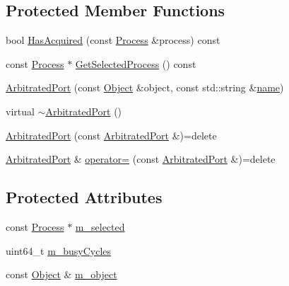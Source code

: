 \subsection*{Protected Member Functions}
\begin{DoxyCompactItemize}
\item 
bool \hyperlink{class_simulator_1_1_arbitrated_port_ad6c149235194bb222005db4ea0352993}{Has\+Acquired} (const \hyperlink{class_simulator_1_1_process}{Process} \&process) const 
\item 
const \hyperlink{class_simulator_1_1_process}{Process} $\ast$ \hyperlink{class_simulator_1_1_arbitrated_port_af666b307417955fb5ac4657986fea2ab}{Get\+Selected\+Process} () const 
\item 
\hyperlink{class_simulator_1_1_arbitrated_port_a1720c2c4547412047aca58dd3ec64d96}{Arbitrated\+Port} (const \hyperlink{class_simulator_1_1_object}{Object} \&object, const std\+::string \&\hyperlink{mtconf_8c_a8f8f80d37794cde9472343e4487ba3eb}{name})
\item 
virtual \hyperlink{class_simulator_1_1_arbitrated_port_a81321f2d8f5db456bb2f0e1710128ea1}{$\sim$\+Arbitrated\+Port} ()
\item 
\hyperlink{class_simulator_1_1_arbitrated_port_a717b1baf7f49444319d47556d26a8608}{Arbitrated\+Port} (const \hyperlink{class_simulator_1_1_arbitrated_port}{Arbitrated\+Port} \&)=delete
\item 
\hyperlink{class_simulator_1_1_arbitrated_port}{Arbitrated\+Port} \& \hyperlink{class_simulator_1_1_arbitrated_port_a5ec4bcf9c7f4dedcb220d56750219c7e}{operator=} (const \hyperlink{class_simulator_1_1_arbitrated_port}{Arbitrated\+Port} \&)=delete
\end{DoxyCompactItemize}
\subsection*{Protected Attributes}
\begin{DoxyCompactItemize}
\item 
const \hyperlink{class_simulator_1_1_process}{Process} $\ast$ \hyperlink{class_simulator_1_1_arbitrated_port_a4530ac48737b148a87a44a6641d2979b}{m\+\_\+selected}
\item 
uint64\+\_\+t \hyperlink{class_simulator_1_1_arbitrated_port_a3fcbb4be3ab62853713ae33f5b3ca8b3}{m\+\_\+busy\+Cycles}
\item 
const \hyperlink{class_simulator_1_1_object}{Object} \& \hyperlink{class_simulator_1_1_arbitrated_port_a1ad6a8b7489f7adbdf487d5e00c86c4d}{m\+\_\+object}
\end{DoxyCompactItemize}


